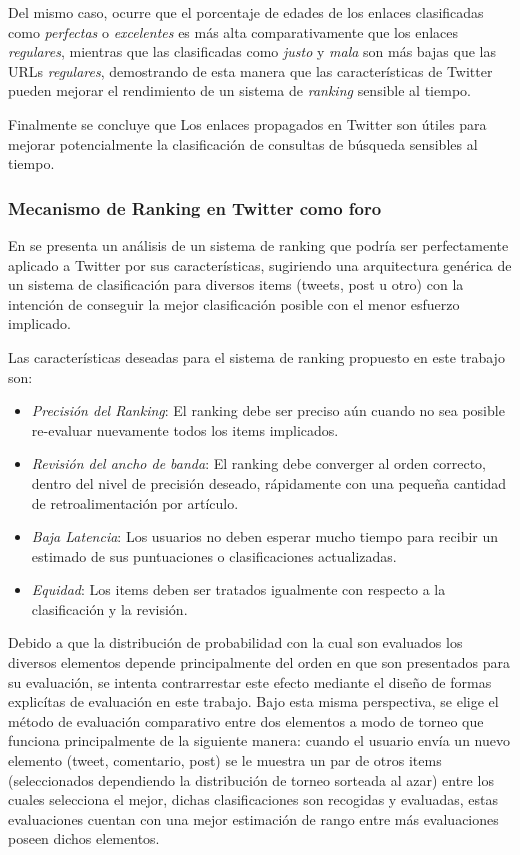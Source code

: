 	Del mismo caso, ocurre que el porcentaje de edades de los enlaces clasificadas como \emph{perfectas} o \emph{excelentes} es más alta comparativamente que los enlaces \emph{regulares}, mientras que las clasificadas como \emph{justo} y \emph{mala} son más bajas que las URLs \emph{regulares}, demostrando de esta manera que las características de Twitter pueden mejorar el rendimiento de un sistema de \emph{ranking} sensible al tiempo.  
	
	Finalmente se concluye que Los enlaces propagados en Twitter son útiles para mejorar potencialmente la clasificación de consultas de búsqueda sensibles al tiempo.
	
\subsubsection{Mecanismo de Ranking en Twitter como foro}

	 En \cite{DasSarma:2010:RMT:1718487.1718491} se presenta un análisis de un sistema
de ranking que podría ser perfectamente aplicado a Twitter por sus características, sugiriendo una arquitectura genérica de un sistema de clasificación para diversos items (tweets, post u otro) con la intención de conseguir la mejor clasificación posible con el menor esfuerzo implicado.

Las características deseadas para el sistema de ranking propuesto en este trabajo son:

	\begin{itemize}
		\item \emph{Precisión del Ranking}: El ranking debe ser preciso aún cuando no sea posible re-evaluar nuevamente todos los items implicados.
		\item \emph{Revisión del ancho de banda}: El ranking debe converger al orden correcto, dentro del nivel de precisión deseado, rápidamente con una pequeña cantidad de retroalimentación por artículo.
		\item \emph{Baja Latencia}: Los usuarios no deben esperar mucho tiempo para recibir un estimado de sus puntuaciones o clasificaciones actualizadas.
		\item \emph{Equidad}: Los items deben ser tratados igualmente con respecto a la clasificación y la revisión.
	\end{itemize}

	Debido a que la distribución de probabilidad con la cual son evaluados los diversos elementos depende principalmente del orden en que son presentados para su evaluación, se intenta contrarrestar este efecto mediante el diseño de formas explicítas de evaluación en este trabajo. Bajo esta misma perspectiva, se elige
	el método de evaluación comparativo entre dos elementos a modo de torneo que funciona principalmente de la siguiente manera: cuando el usuario envía un nuevo elemento (tweet, comentario, post) se le muestra un par de otros items (seleccionados dependiendo la distribución de torneo sorteada al azar) entre los cuales selecciona el mejor, dichas clasificaciones son recogidas y evaluadas, estas evaluaciones cuentan con una mejor estimación de rango entre más evaluaciones poseen dichos elementos.
	
